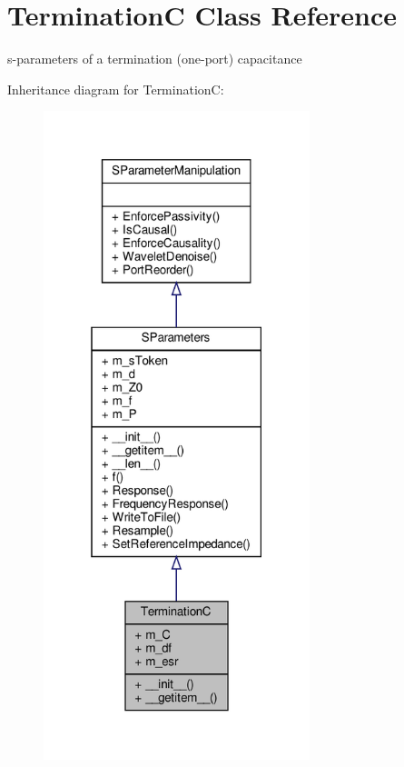\hypertarget{classSignalIntegrity_1_1SParameters_1_1Devices_1_1TerminationC_1_1TerminationC}{}\section{TerminationC Class Reference}
\label{classSignalIntegrity_1_1SParameters_1_1Devices_1_1TerminationC_1_1TerminationC}


s-\/parameters of a termination (one-\/port) capacitance  




Inheritance diagram for TerminationC\+:
\nopagebreak
\begin{figure}[H]
\begin{center}
\leavevmode
\includegraphics[width=220pt]{classSignalIntegrity_1_1SParameters_1_1Devices_1_1TerminationC_1_1TerminationC__inherit__graph}
\end{center}
\end{figure}


